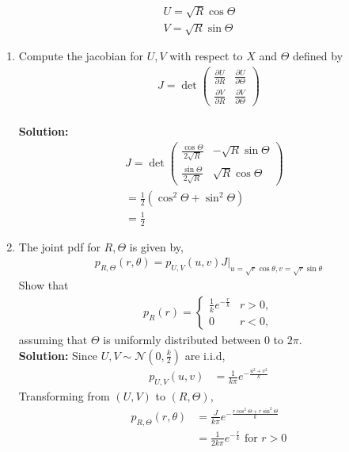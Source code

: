 \documentclass[journal,8pt,onecolumn]{IEEEtran}
\providecommand{\brak}[1]{\ensuremath{\left(#1\right)}}
\newcommand{\solution}{\noindent \textbf{Solution: }}
\begin{document}
\begin{enumerate}
%
\begin{align}
U = \sqrt{R} \cos \Theta \\
V = \sqrt{R} \sin \Theta
\end{align}
\begin{enumerate}[label=(\alph{enumii})]
\item 
Compute the jacobian for $U,V$ with respect to $X$ and $\Theta$ defined by
%
\begin{align}
J = \det\brak{
\begin{matrix}
\frac{\partial U}{\partial R} & \frac{\partial U}{\partial \Theta} \\
\frac{\partial V}{\partial R} & \frac{\partial V}{\partial \Theta}
\end{matrix}
}
\end{align}\\
\solution 
\begin{align}
J = \det\brak{
\begin{matrix}
\frac{\cos \Theta}{2\sqrt{R}} & -\sqrt{R}\sin \Theta \\
\frac{\sin \Theta}{2\sqrt{R}} & \sqrt{R}\cos \Theta
\end{matrix}
}\\
= \frac{1}{2}\brak{\cos^2\Theta + \sin^2\Theta}&\\
= \frac{1}{2}&
\end{align}
\item 
The joint pdf for $R,\Theta$ is given by,
%
\begin{align}
p_{R,\Theta}\brak{r,\theta} = p_{U,V}\brak{u,v}J\vert_{u = \sqrt{r}\cos\theta,v = \sqrt{r}\sin\theta}
\end{align}
Show that
%
\begin{align}
p_{R}(r) = 
\begin{cases}
\frac{1}{k}e^{-\frac{r}{k}} & r > 0, \\
0 & r < 0,
\end{cases}
\end{align}
%
assuming that $\Theta$ is uniformly distributed between 0 to $2\pi$.\\
\solution Since $U,V\sim\mathcal{N}\brak{0,\frac{k}{2}}$ are i.i.d,
\begin{align}
	p_{U,V}\brak{u,v} &= \frac{1}{k\pi}e^{-\frac{u^2+v^2}{k}}
\end{align}
Transforming from $(U,V)$ to $(R,\Theta)$,
\begin{align}
	p_{R,\Theta}\brak{r,\theta} &= \frac{J}{k\pi}e^{-\frac{r\cos^2\Theta+r\sin^2\Theta}{k}}\\
	&= \frac{1}{2k\pi}e^{-\frac{r}{k}} \text{ for $r > 0$}

\end{align}
\end{enumerate}
\end{enumerate}
\end{document}
